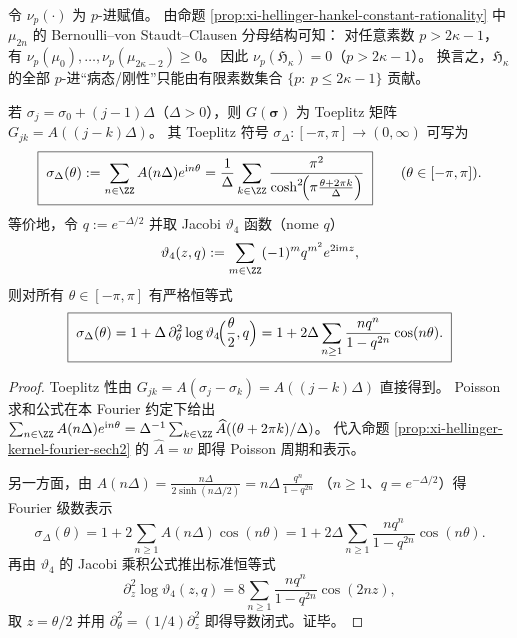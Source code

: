 \begin{remark}[算术带宽定律：\texorpdfstring{$\mathfrak H_\kappa$}{H_k} 的 \texorpdfstring{$p$}{p}-进刚性仅支持于 \texorpdfstring{$p\le 2\kappa-1$}{p<=2k-1}]\label{rem:xi-hellinger-hankel-padic-bandwidth}
令 \(\nu_p(\cdot)\) 为 \(p\)-进赋值。
由命题 \ref{prop:xi-hellinger-hankel-constant-rationality} 中 \(\mu_{2n}\) 的 Bernoulli--von Staudt--Clausen 分母结构可知：
对任意素数 \(p>2\kappa-1\)，有 \(\nu_p(\mu_0),\dots,\nu_p(\mu_{2\kappa-2})\ge 0\)。
因此 \(\nu_p(\mathfrak H_\kappa)=0\)（\(p>2\kappa-1\)）。
换言之，\(\mathfrak H_\kappa\) 的全部 \(p\)-进“病态/刚性”只能由有限素数集合 \(\{p:\ p\le 2\kappa-1\}\) 贡献。
\end{remark}

\begin{proposition}\label{prop:xi-hellinger-toeplitz-symbol-poisson}
若 \(\sigma_j=\sigma_0+(j-1)\Delta\)（\(\Delta>0\)），则 \(G(\boldsymbol{\sigma})\) 为 Toeplitz 矩阵
\(
G_{jk}=A((j-k)\Delta)
\)。
其 Toeplitz 符号 \(\sigma_\Delta:[-\pi,\pi]\to(0,\infty)\) 可写为
\[
\boxed{\;
\sigma_\Delta(\theta)
:=\sum_{n\in\ZZ}A(n\Delta)e^{\mathrm{i}n\theta}
=\frac{1}{\Delta}\sum_{k\in\ZZ}\frac{\pi^{2}}{\cosh^{2}\!\Bigl(\pi\frac{\theta+2\pi k}{\Delta}\Bigr)}\;}
\qquad(\theta\in[-\pi,\pi]).
\]
等价地，令 \(q:=e^{-\Delta/2}\) 并取 Jacobi \(\vartheta_4\) 函数（nome \(q\)）
\[
\vartheta_4(z,q):=\sum_{m\in\ZZ}(-1)^m q^{m^2}e^{2\mathrm{i}mz},
\]
则对所有 \(\theta\in[-\pi,\pi]\) 有严格恒等式
\[
\boxed{\;
\sigma_\Delta(\theta)
=1+\Delta\,\partial_\theta^{2}\log\vartheta_4\!\Bigl(\frac{\theta}{2},q\Bigr)
=1+2\Delta\sum_{n\ge 1}\frac{nq^{n}}{1-q^{2n}}\cos(n\theta).\;}
\]
\end{proposition}
\begin{proof}
Toeplitz 性由 \(G_{jk}=A(\sigma_j-\sigma_k)=A((j-k)\Delta)\) 直接得到。
Poisson 求和公式在本 Fourier 约定下给出
\(
\sum_{n\in\ZZ}A(n\Delta)e^{\mathrm{i}n\theta}
=\Delta^{-1}\sum_{k\in\ZZ}\widehat A((\theta+2\pi k)/\Delta)
\)。
代入命题 \ref{prop:xi-hellinger-kernel-fourier-sech2} 的 \(\widehat A=w\) 即得 Poisson 周期和表示。
\par
另一方面，由
\(
A(n\Delta)=\frac{n\Delta}{2\sinh(n\Delta/2)}
=n\Delta\,\frac{q^n}{1-q^{2n}}
\)
（\(n\ge 1\)、\(q=e^{-\Delta/2}\)）得 Fourier 级数表示
\[
\sigma_\Delta(\theta)=1+2\sum_{n\ge 1}A(n\Delta)\cos(n\theta)
=1+2\Delta\sum_{n\ge 1}\frac{nq^{n}}{1-q^{2n}}\cos(n\theta).
\]
再由 \(\vartheta_4\) 的 Jacobi 乘积公式推出标准恒等式
\[
\partial_z^{2}\log\vartheta_4(z,q)
=8\sum_{n\ge 1}\frac{nq^{n}}{1-q^{2n}}\cos(2nz),
\]
取 \(z=\theta/2\) 并用 \(\partial_\theta^{2}=(1/4)\partial_z^{2}\) 即得导数闭式。证毕。
\end{proof}


